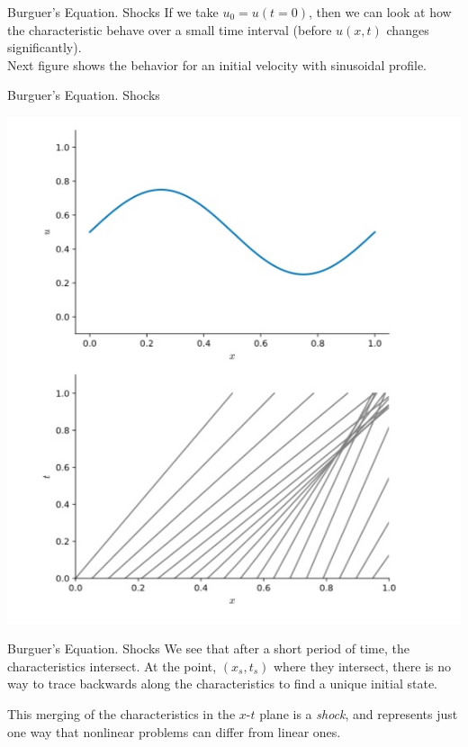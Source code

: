 \documentclass[11pt]{beamer}
\begin{document}
\begin{frame}[fragile]{Burguer's Equation. Shocks}
 If we take $u_0 = u(t=0)$, then we can look at how the characteristic
behave over a small time interval (before $u(x,t)$ changes
significantly).\\
Next figure shows the behavior for
an initial velocity with sinusoidal profile.  
\end{frame}

\begin{frame}[fragile]{Burguer's Equation. Shocks}
\begin{center}
\includegraphics[scale=0.3]{burguerscharact}
\end{center}
\end{frame}

\begin{frame}[fragile]{Burguer's Equation. Shocks}
We see that after a
short period of time, the characteristics intersect.  At the point,
$(x_s, t_s)$ where they intersect, there is no way to trace backwards
along the characteristics to find a unique initial state.  \\
\bigskip

This
merging of the characteristics in the $x$-$t$ plane is a {\em shock}, and
represents just one way that nonlinear problems can differ from linear
ones.
\end{frame}
\end{document}
